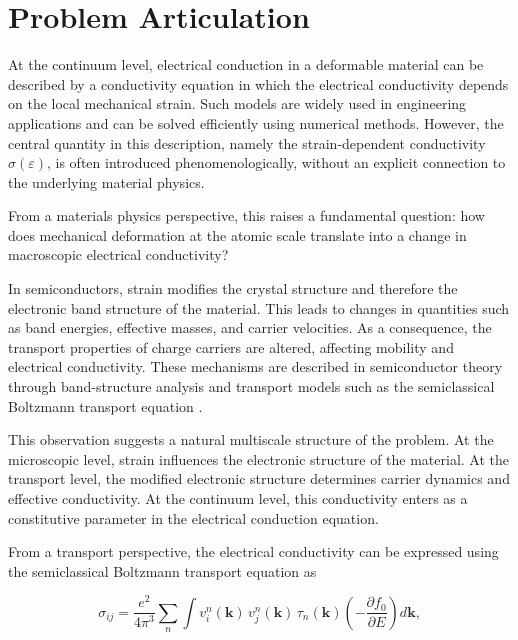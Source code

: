 \section{Problem Articulation}

At the continuum level, electrical conduction in a deformable material can be described 
by a conductivity equation in which the electrical conductivity depends on the local mechanical strain. 
Such models are widely used in engineering applications and can be solved efficiently using numerical methods. 
However, the central quantity in this description, namely the strain-dependent conductivity $\sigma(\varepsilon)$, 
is often introduced phenomenologically, without an explicit connection to the underlying material physics.

From a materials physics perspective, this raises a fundamental question: 
how does mechanical deformation at the atomic scale translate into a change in macroscopic electrical conductivity?

In semiconductors, strain modifies the crystal structure and therefore the electronic band structure of the material. 
This leads to changes in quantities such as band energies, effective masses, and carrier velocities. 
As a consequence, the transport properties of charge carriers are altered, affecting mobility and electrical conductivity. 
These mechanisms are described in semiconductor theory through band-structure analysis and transport models 
such as the semiclassical Boltzmann transport equation \cite{hamaguchi}.

This observation suggests a natural multiscale structure of the problem. 
At the microscopic level, strain influences the electronic structure of the material. 
At the transport level, the modified electronic structure determines carrier dynamics and effective conductivity. 
At the continuum level, this conductivity enters as a constitutive parameter in the electrical conduction equation.

From a transport perspective, the electrical conductivity can be expressed using the semiclassical Boltzmann transport equation as

\begin{equation}
\sigma_{ij} = \frac{e^2}{4\pi^3}\sum_n \int v_i^n(\mathbf{k})\, v_j^n(\mathbf{k})\, \tau_n(\mathbf{k})
\left(-\frac{\partial f_0}{\partial E}\right) d\mathbf{k},
\end{equation}

